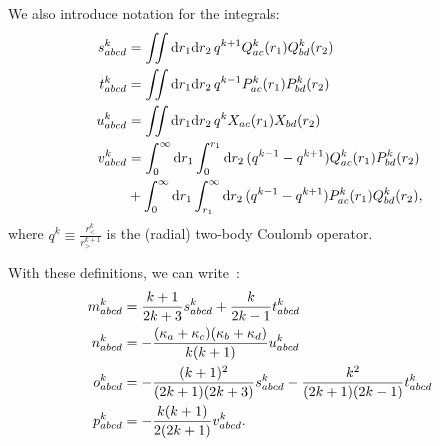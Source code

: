 \documentclass[10pt,twocolumn,a4paper]{article}%
\def\d{\ensuremath{{\rm d}}}
\renewcommand{\k}{\ensuremath{\kappa}}
\begin{document}
We also introduce notation for the integrals:
\begin{equation}
\begin{split}
    s^k_{abcd} &= \iint\d r_1\d r_2 \, q^{k+1}Q^k_{ac}(r_1)Q^k_{bd}(r_2)\\
    t^k_{abcd} &= \iint\d r_1\d r_2 \, q^{k-1}P^k_{ac}(r_1)P^k_{bd}(r_2)\\
    u^k_{abcd} &= \iint\d r_1\d r_2 \, q^{k}X_{ac}(r_1)X_{bd}(r_2)\\
    v^k_{abcd} &= \int_0^\infty\d r_1\int_0^{r_1}\d r_2 \, (q^{k-1}-q^{k+1})Q^k_{ac}(r_1)P^k_{bd}(r_2)\\
    &+ \int_0^\infty\d r_1\int_{r_1}^\infty\d r_2 \, (q^{k-1}-q^{k+1})P^k_{ac}(r_1)Q^k_{bd}(r_2),
\end{split}
\end{equation}
where $q^k\equiv\frac{r_<^k}{r_>^{k+1}}$ is the (radial) two-body Coulomb operator.

With these definitions, we can write~\cite{Mann1971,JohnsonBook2007}:
\begin{align}
m^k_{abcd} &= \frac{k+1}{2k+3}s^k_{abcd}+\frac{k}{2k-1}t^k_{abcd}\notag\\
n^k_{abcd} &= -\frac{(\k_a+\k_c)(\k_b+\k_d)}{k(k+1)}u^k_{abcd}\\
o^k_{abcd} &= -\frac{(k+1)^2}{(2k+1)(2k+3)}s^k_{abcd}-\frac{k^2}{(2k+1)(2k-1)}t^k_{abcd}\notag\\
p^k_{abcd} &= -\frac{k(k+1)}{2(2k+1)}v^k_{abcd}.\notag
\end{align}
\end{document}
